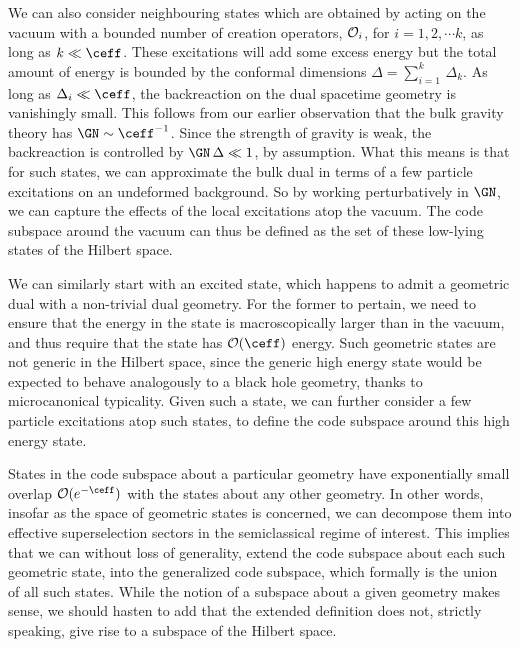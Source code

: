 \documentclass[12pt,openany]{book}
\begin{document}
We can also consider neighbouring states which are obtained by acting on the vacuum with a bounded number of creation operators, ${\cal O}_i$, for $i = 1, 2, \cdots k$, as long as $k \ll \ceff$. These excitations will add some excess energy but the total amount of energy is bounded by the conformal dimensions $\Delta = \sum_{i=1}^k \, \Delta_k$. As long as $\Delta_i \ll \ceff$, the backreaction on the dual spacetime geometry is vanishingly small. This follows from our earlier observation that the bulk gravity theory has
$\GN \sim \ceff^{-1}$. Since the strength of gravity is weak, the backreaction is controlled by $\GN\, \Delta \ll 1$, by assumption. What this means is that for such states, we can approximate the bulk dual in terms of a few particle excitations on an undeformed  background. So by working perturbatively in $\GN$, we can capture the effects of the local excitations atop the vacuum. The code subspace around the vacuum can thus be defined as the set of these low-lying states of the Hilbert space.


We can similarly  start with an excited state, which happens to admit a geometric dual with a non-trivial dual geometry.  For the former to pertain, we need to ensure that the energy in the state is macroscopically larger than in the vacuum, and thus require that the state has ${\cal O}(\ceff) $ energy. Such geometric states are not generic in the Hilbert space, since the generic high energy state would be expected to behave analogously to a black hole geometry, thanks to microcanonical typicality. Given such a state, we can further consider a few particle excitations atop such states, to define the code subspace around this high energy state.

States in the code subspace about a particular geometry have exponentially small overlap $\mathcal{O}(e^{-\ceff})$ with the states about any other geometry. In other words, insofar as the space of geometric states is concerned, we can decompose them into effective superselection sectors in the semiclassical regime of interest. This implies that we can without loss of generality, extend the code subspace about each such geometric state, into the generalized code subspace, which formally is the union of all such states. While the notion of a subspace about a given geometry makes sense, we should hasten to add that the extended definition does not, strictly speaking, give rise to a subspace of the Hilbert space.
\end{document}
